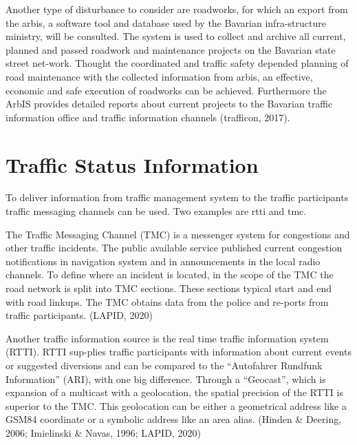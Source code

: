 \documentclass[a4paper,12pt]{report}
\begin{document}
\par Another type of disturbance to consider are roadworks, for which an export from the \acrfull{arbis}, a software tool and database used by the Bavarian infra-structure ministry, will be consulted. The system is used to collect and archive all current, planned and passed roadwork and maintenance projects on the Bavarian state street net-work. Thought the coordinated and traffic safety depended planning of road maintenance with the collected information from \acrshort{arbis}, an effective, economic and safe execution of roadworks can be achieved. Furthermore the ArbIS provides detailed reports about current projects to the Bavarian traffic information office and traffic information channels (trafficon, 2017).

\section{Traffic Status Information}

\par To deliver information from traffic management system to the traffic participants traffic messaging channels can be used. Two examples are \acrfull{rtti} and \acrfull{tmc}.

\par The Traffic Messaging Channel (TMC) is a messenger system for congestions and other traffic incidents. The public available service published current congestion notifications in navigation system and in announcements in the local radio channels. To define where an incident is located, in the scope of the TMC the road network is split into TMC sections. These sections typical start and end with road linkups. The TMC obtains data from the police and re-ports from traffic participants. (LAPID, 2020)

\par Another traffic information source is the real time traffic information system (RTTI). RTTI sup-plies traffic participants with information about current events or suggested diversions and can be compared to the “Autofahrer Rundfunk Information” (ARI), with one big difference. Through a “Geocast”, which is expansion of a multicast with a geolocation, the spatial precision of the RTTI is superior to the TMC. This geolocation can be either a geometrical address like a GSM84 coordinate or a symbolic address like an area alias. (Hinden \& Deering, 2006; Imielinski \& Navas, 1996; LAPID, 2020) \newline
\end{document}
